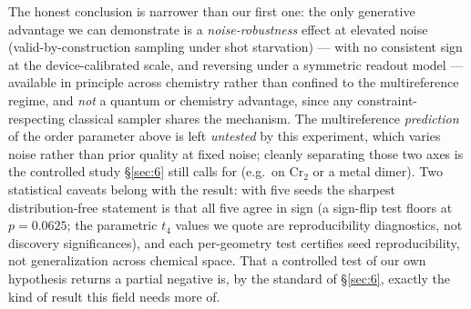 \documentclass[onecolumn,a4paper]{quantumarticle}
\begin{document}
The honest conclusion is narrower than our first one: the only generative advantage we can demonstrate is a \emph{noise-robustness} effect at elevated noise (valid-by-construction sampling under shot starvation) --- with no consistent sign at the device-calibrated scale, and reversing under a symmetric readout model --- available in principle across chemistry rather than confined to the multireference regime, and \emph{not} a quantum or chemistry advantage, since any constraint-respecting classical sampler shares the mechanism. The multireference \emph{prediction} of the order parameter above is left \emph{untested} by this experiment, which varies noise rather than prior quality at fixed noise; cleanly separating those two axes is the controlled study \S\ref{sec:6} still calls for (e.g.\ on Cr$_2$ or a metal dimer). Two statistical caveats belong with the result: with five seeds the sharpest distribution-free statement is that all five agree in sign (a sign-flip test floors at $p{=}0.0625$; the parametric $t_4$ values we quote are reproducibility diagnostics, not discovery significances), and each per-geometry test certifies seed reproducibility, not generalization across chemical space. That a controlled test of our own hypothesis returns a partial negative is, by the standard of \S\ref{sec:6}, exactly the kind of result this field needs more of.
\end{document}
